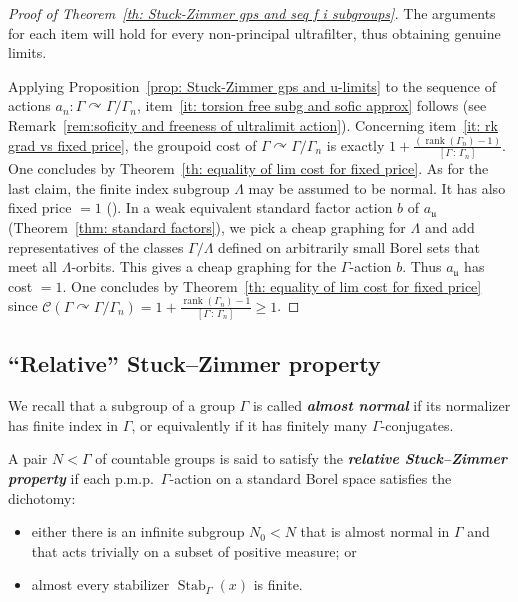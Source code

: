 \documentclass[10pt]{amsart}
\theoremstyle{definition}
\newcommand{\defin}[1]{\textbf{\emph{#1}}}
\newcommand{\acting}{\curvearrowright}
\newcommand{\cost}{\mathcal{C}}
\DeclareMathOperator{\rank}{rank}
\DeclareMathOperator{\Stab}{Stab}
\newcommand{\ul}{\mathfrak{u}}
\newcommand{\pmp}{p.m.p.\ }
\begin{document}
\begin{proof}[Proof of Theorem~\ref{th: Stuck-Zimmer gps and seq f i subgroups}]
The arguments for each item will hold for every non-principal ultrafilter, thus obtaining genuine limits.

Applying Proposition~\ref{prop: Stuck-Zimmer gps and u-limits} to the sequence of actions $a_n:\Gamma\acting \Gamma/\Gamma_n$, item~\eqref{it: torsion free subg and sofic approx} follows (see Remark~\ref{rem:soficity and freeness of ultralimit action}). Concerning item~\eqref{it: rk grad vs fixed price}, the groupoid cost of $\Gamma\acting \Gamma/\Gamma_n$ is exactly $1+ \frac{(\rank (\Gamma_n)-1)}{[\Gamma\,:\,\Gamma_n]}$. One concludes by Theorem~\ref{th: equality of lim cost for fixed price}. As for the last claim, the finite index subgroup $\Lambda$ may be assumed to be normal. It has also fixed price $=1$ (\cite{Gab-cost}). In a weak equivalent standard factor action $b$ of $a_{\ul}$ (Theorem~\ref{thm: standard factors}), we pick a cheap graphing for $\Lambda$ and add representatives of the classes $\Gamma/\Lambda$ defined on arbitrarily small Borel sets that meet all $\Lambda$-orbits. This gives a cheap graphing for the $\Gamma$-action $b$. Thus $a_{\ul}$ has cost $=1$. One concludes by Theorem~\ref{th: equality of lim cost for fixed price} since $\cost(\Gamma\acting \Gamma/\Gamma_n)=1+\frac{\rank (\Gamma_n)-1 }{ [\Gamma\,:\,\Gamma_n]}\geq 1$.
\end{proof}



\subsection{``Relative'' Stuck--Zimmer property}

We recall that a subgroup of a group $\Gamma$ is called
\defin{almost normal} if its normalizer has finite index in $\Gamma$, or equivalently if it has finitely many $\Gamma$-conjugates.



A pair $N<\Gamma$ of countable groups is said to satisfy the
\defin{relative Stuck--Zimmer property} if each \pmp $\Gamma$-action on a standard Borel space satisfies the dichotomy:
\begin{itemize}
\item[--] either there is an infinite subgroup $N_0 < N$ that is almost normal in $\Gamma$ and that acts trivially on a subset of positive measure; or
\item[--] almost every stabilizer $\Stab_{\Gamma}(x)$ is finite.
\end{itemize}
\end{document}
